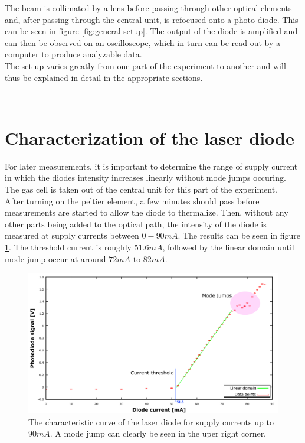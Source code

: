 The beam is collimated by a lens before passing through other optical elements and, after passing through the central unit, is refocused onto a photo-diode. This can be seen in figure \ref{fig:general setup}. The output of the diode is amplified and can then be observed on an oscilloscope, which in turn can be read out by a computer to produce analyzable data.\\ 

The set-up varies greatly from one part of the experiment to another and will thus be explained in detail in the appropriate sections.

\
\section{Characterization of the laser diode}
For later measurements, it is important to determine the range of supply current in which the diodes intensity increases linearly without mode jumps occuring. The gas cell is taken out of the central unit for this part of the experiment. \\

After turning on the peltier element, a few minutes should pass before measurements are started to allow the diode to thermalize. Then, without any other parts being added to the optical path, the intensity of the diode is measured at supply currents between $\unit{0-90}{mA}$. The results can be seen in figure \ref{fig:characterization}. The threshold current is roughly $\unit{51.6}{mA}$, followed by the linear domain until mode jump occur at around $\unit{72}{mA}$ to $\unit{82}{mA}$. 
\begin{figure}[htb]
\centering
\includegraphics[width=1.0\linewidth]{graphics/characterization}
\caption[Characteristic curve of the laser diode]{The characteristic curve of the laser diode for supply currents up to $\unit{90}{mA}$. A mode jump can clearly be seen in the uper right corner.}
\label{fig:characterization}
\end{figure}


